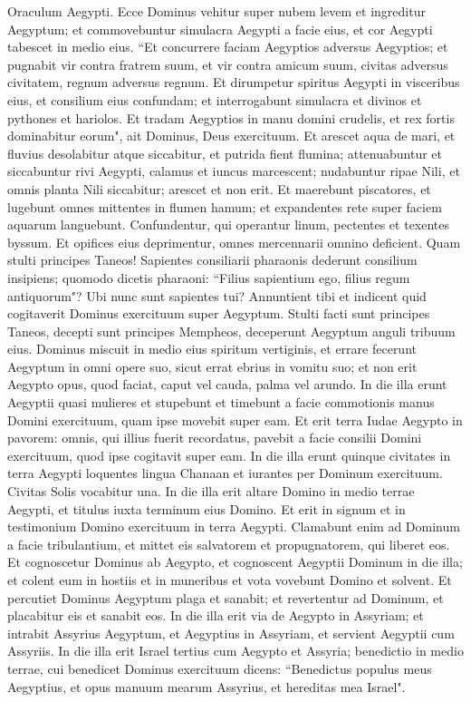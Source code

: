 \begin{biblechapter}  
\verse Oraculum Aegypti. Ecce Dominus vehitur super nubem levem et ingreditur Aegyptum; et commovebuntur simulacra Aegypti a facie eius, et cor Aegypti tabescet in medio eius. 
\verse “Et concurrere faciam Aegyptios adversus Aegyptios; et pugnabit vir contra fratrem suum, et vir contra amicum suum, civitas adversus civitatem, regnum adversus regnum. 
\verse Et dirumpetur spiritus Aegypti in visceribus eius, et consilium eius confundam; et interrogabunt simulacra et divinos et pythones et hariolos. 
\verse Et tradam Aegyptios in manu domini crudelis, et rex fortis dominabitur eorum", ait Dominus, Deus exercituum. 
\verse Et arescet aqua de mari, et fluvius desolabitur atque siccabitur, 
\verse et putrida fient flumina; attenuabuntur et siccabuntur rivi Aegypti, calamus et iuncus marcescent; 
\verse nudabuntur ripae Nili, et omnis planta Nili siccabitur; arescet et non erit. 
\verse Et maerebunt piscatores, et lugebunt omnes mittentes in flumen hamum; et expandentes rete super faciem aquarum languebunt. 
\verse Confundentur, qui operantur linum, pectentes et texentes byssum. 
\verse Et opifices eius deprimentur, omnes mercennarii omnino deficient. 
\verse Quam stulti principes Taneos! Sapientes consiliarii pharaonis dederunt consilium insipiens; quomodo dicetis pharaoni: “Filius sapientium ego, filius regum antiquorum"? 
\verse Ubi nunc sunt sapientes tui? Annuntient tibi et indicent quid cogitaverit Dominus exercituum super Aegyptum. 
\verse Stulti facti sunt principes Taneos, decepti sunt principes Mempheos, deceperunt Aegyptum anguli tribuum eius. 
\verse Dominus miscuit in medio eius spiritum vertiginis, et errare fecerunt Aegyptum in omni opere suo, sicut errat ebrius in vomitu suo; 
\verse et non erit Aegypto opus, quod faciat, caput vel cauda, palma vel arundo. 
\verse In die illa erunt Aegyptii quasi mulieres et stupebunt et timebunt a facie commotionis manus Domini exercituum, quam ipse movebit super eam. 
\verse Et erit terra Iudae Aegypto in pavorem: omnis, qui illius fuerit recordatus, pavebit a facie consilii Domini exercituum, quod ipse cogitavit super eam. 
\verse In die illa erunt quinque civitates in terra Aegypti loquentes lingua Chanaan et iurantes per Dominum exercituum. Civitas Solis vocabitur una. 
\verse In die illa erit altare Domino in medio terrae Aegypti, et titulus iuxta terminum eius Domino. 
\verse Et erit in signum et in testimonium Domino exercituum in terra Aegypti. Clamabunt enim ad Dominum a facie tribulantium, et mittet eis salvatorem et propugnatorem, qui liberet eos. 
\verse Et cognoscetur Dominus ab Aegypto, et cognoscent Aegyptii Dominum in die illa; et colent eum in hostiis et in muneribus et vota vovebunt Domino et solvent. 
\verse Et percutiet Dominus Aegyptum plaga et sanabit; et revertentur ad Dominum, et placabitur eis et sanabit eos. 
\verse In die illa erit via de Aegypto in Assyriam; et intrabit Assyrius Aegyptum, et Aegyptius in Assyriam, et servient Aegyptii cum Assyriis. 
\verse In die illa erit Israel tertius cum Aegypto et Assyria; benedictio in medio terrae, 
\verse cui benedicet Dominus exercituum dicens: “Benedictus populus meus Aegyptius, et opus manuum mearum Assyrius, et hereditas mea Israel". 
\end{biblechapter}

